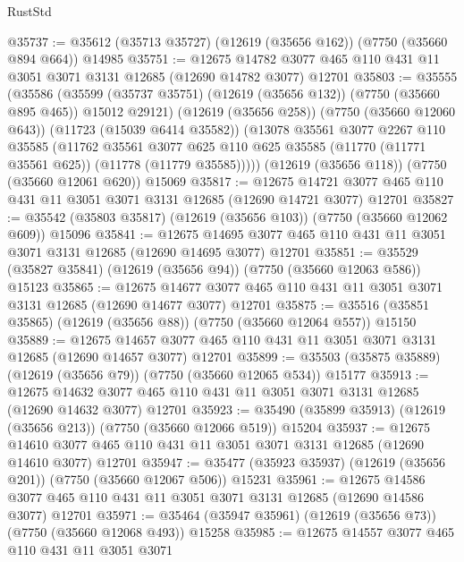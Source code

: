 \begin{lexlean}{RustStd}
\begin{coremodule}
@35737 := @35612 (@35713 @35727) (@12619 (@35656 @162)) (@7750 (@35660 @894 @664)) @14985
@35751 := @12675
    @14782
    @3077
    @465
    @110
    @431
    @11
    @3051
    @3071
    @3131
    @12685
    (@12690 @14782 @3077)
    @12701
@35803 := @35555
    (@35586
      (@35599 (@35737 @35751) (@12619 (@35656 @132)) (@7750 (@35660 @895 @465)) @15012 @29121)
      (@12619 (@35656 @258))
      (@7750 (@35660 @12060 @643))
      (@11723 (@15039 @6414 @35582))
      (@13078
        @35561
        @3077
        @2267
        @110
        @35585
        (@11762
          @35561
          @3077
          @625
          @110
          @625
          @35585
          (@11770 (@11771 @35561 @625))
          (@11778 (@11779 @35585)))))
    (@12619 (@35656 @118))
    (@7750 (@35660 @12061 @620))
    @15069
@35817 := @12675
    @14721
    @3077
    @465
    @110
    @431
    @11
    @3051
    @3071
    @3131
    @12685
    (@12690 @14721 @3077)
    @12701
@35827 := @35542 (@35803 @35817) (@12619 (@35656 @103)) (@7750 (@35660 @12062 @609)) @15096
@35841 := @12675
    @14695
    @3077
    @465
    @110
    @431
    @11
    @3051
    @3071
    @3131
    @12685
    (@12690 @14695 @3077)
    @12701
@35851 := @35529 (@35827 @35841) (@12619 (@35656 @94)) (@7750 (@35660 @12063 @586)) @15123
@35865 := @12675
    @14677
    @3077
    @465
    @110
    @431
    @11
    @3051
    @3071
    @3131
    @12685
    (@12690 @14677 @3077)
    @12701
@35875 := @35516 (@35851 @35865) (@12619 (@35656 @88)) (@7750 (@35660 @12064 @557)) @15150
@35889 := @12675
    @14657
    @3077
    @465
    @110
    @431
    @11
    @3051
    @3071
    @3131
    @12685
    (@12690 @14657 @3077)
    @12701
@35899 := @35503 (@35875 @35889) (@12619 (@35656 @79)) (@7750 (@35660 @12065 @534)) @15177
@35913 := @12675
    @14632
    @3077
    @465
    @110
    @431
    @11
    @3051
    @3071
    @3131
    @12685
    (@12690 @14632 @3077)
    @12701
@35923 := @35490 (@35899 @35913) (@12619 (@35656 @213)) (@7750 (@35660 @12066 @519)) @15204
@35937 := @12675
    @14610
    @3077
    @465
    @110
    @431
    @11
    @3051
    @3071
    @3131
    @12685
    (@12690 @14610 @3077)
    @12701
@35947 := @35477 (@35923 @35937) (@12619 (@35656 @201)) (@7750 (@35660 @12067 @506)) @15231
@35961 := @12675
    @14586
    @3077
    @465
    @110
    @431
    @11
    @3051
    @3071
    @3131
    @12685
    (@12690 @14586 @3077)
    @12701
@35971 := @35464 (@35947 @35961) (@12619 (@35656 @73)) (@7750 (@35660 @12068 @493)) @15258
@35985 := @12675
    @14557
    @3077
    @465
    @110
    @431
    @11
    @3051
    @3071

\end{coremodule}
\end{lexlean}
